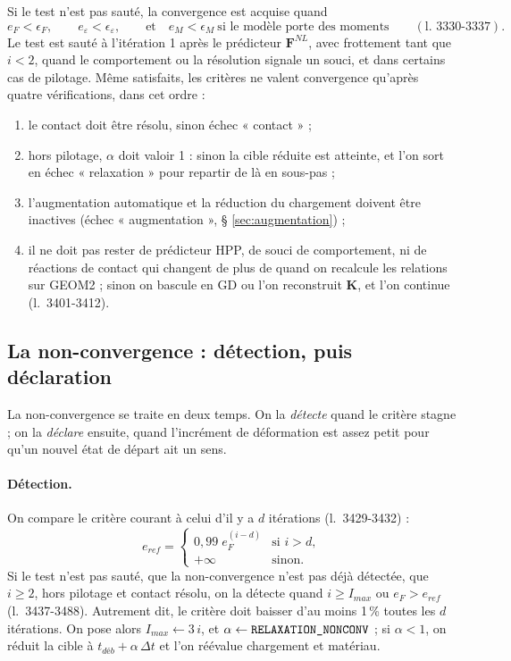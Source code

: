 \documentclass[11pt,a4paper]{article}
\numberwithin{equation}{section}
\newcommand{\src}[1]{\texttt{\detokenize{#1}}}          %
\newcommand{\lig}[1]{l.~#1}
\newcommand{\vc}[1]{\symbf{#1}}                         %
\newcommand{\eps}{\varepsilon}
\begin{document}
Si le test n'est pas sauté, la convergence est acquise quand
\begin{equation}
e_F < \epsilon_F,\qquad e_\eps < \epsilon_\eps,\qquad \text{et}\quad e_M < \epsilon_M \ \text{si le modèle porte des moments}
\qquad(\text{\lig{3330-3337}}).
\end{equation}
Le test est sauté à l'itération 1 après le prédicteur $\vc F^{NL}$, avec frottement tant que $i < 2$, quand le comportement ou la résolution signale un souci, et dans certains cas de pilotage.
Même satisfaits, les critères ne valent convergence qu'après quatre vérifications, dans cet ordre :
\begin{enumerate}
\item le contact doit être résolu, sinon échec « contact » ;
\item hors pilotage, $\alpha$ doit valoir 1 : sinon la cible réduite est atteinte, et l'on sort en échec « relaxation » pour repartir de là en sous-pas ;
\item l'augmentation automatique et la réduction du chargement doivent être inactives (échec « augmentation », § \ref{sec:augmentation}) ;
\item il ne doit pas rester de prédicteur HPP, de souci de comportement, ni de réactions de contact qui changent de plus de \src{PRECISION} quand on recalcule les relations sur GEOM2 ; sinon on bascule en GD ou l'on reconstruit $\vc K$, et l'on continue (\lig{3401-3412}).
\end{enumerate}

\subsection{La non-convergence : détection, puis déclaration}

La non-convergence se traite en deux temps.
On la \emph{détecte} quand le critère stagne ; on la \emph{déclare} ensuite, quand l'incrément de déformation est assez petit pour qu'un nouvel état de départ ait un sens.

\paragraph{Détection.}
On compare le critère courant à celui d'il y a $d$ itérations (\lig{3429-3432}) :
\begin{equation}
e_{ref} = \begin{cases}0{,}99\;e_F^{(i-d)} & \text{si } i > d,\\ +\infty & \text{sinon.}\end{cases}
\end{equation}
Si le test n'est pas sauté, que la non-convergence n'est pas déjà détectée, que $i \ge 2$, hors pilotage et contact résolu, on la détecte quand $i \ge I_{max}$ ou $e_F > e_{ref}$ (\lig{3437-3488}).
Autrement dit, le critère doit baisser d'au moins 1\,\% toutes les $d$ itérations.
On pose alors $I_{max} \gets 3\,i$, et $\alpha \gets \src{RELAXATION_NONCONV}$ ; si $\alpha < 1$, on réduit la cible à $t_{déb} + \alpha\,\Delta t$ et l'on réévalue chargement et matériau.
\end{document}
